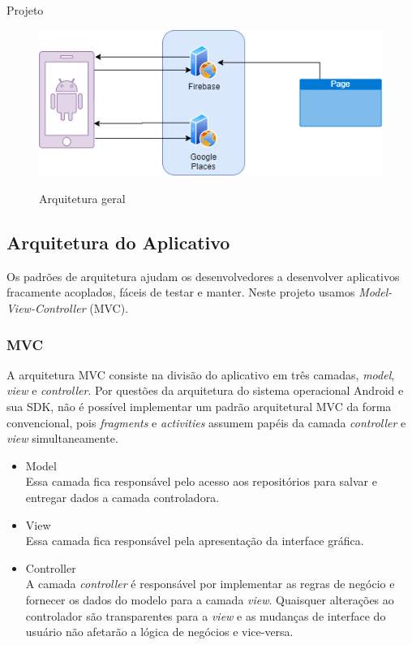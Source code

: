 \documentclass[
	12pt,				%
	openany,			%
	twoside,			%
	a4paper,			%
	english,			%
	french,				%
	spanish,			%
	brazil				%
	]{abntex2}
\begin{document}
\begin{chapter}{Projeto}
\begin{figure}[h]
\centering
   \caption{Arquitetura geral}
   \includegraphics[scale=0.85]{media/arquitetura_app.png}
     \label{fig:arquitetura_geral}
\end{figure}

\subsection{Arquitetura do Aplicativo}
Os padrões de arquitetura ajudam os desenvolvedores a desenvolver aplicativos fracamente acoplados, fáceis de testar e manter.
Neste projeto usamos \textit{Model-View-Controller} (MVC).

\subsubsection{MVC}
A arquitetura MVC consiste na divisão do aplicativo em três camadas,  \textit{model}, \textit{view} e \textit{controller}. Por questões da arquitetura do sistema operacional Android e sua SDK, não é possível implementar um padrão arquitetural MVC da forma convencional, pois \textit{fragments} e \textit{activities} assumem papéis da camada \textit{controller} e \textit{view} simultaneamente.

\begin{itemize}
  \item{Model}\\ Essa camada fica responsável pelo acesso aos repositórios para salvar e entregar dados a camada controladora.
     \item{View}\\ Essa camada fica responsável pela apresentação da interface gráfica.
       \item{Controller}\\ A camada \textit{controller} é responsável por implementar as regras de negócio e fornecer os dados do modelo para a camada \textit{view}. Quaisquer alterações ao controlador são transparentes para a \textit{view} e as mudanças de interface do usuário não afetarão a lógica de negócios e vice-versa.
\end{itemize}


\end{chapter}
\end{document}
